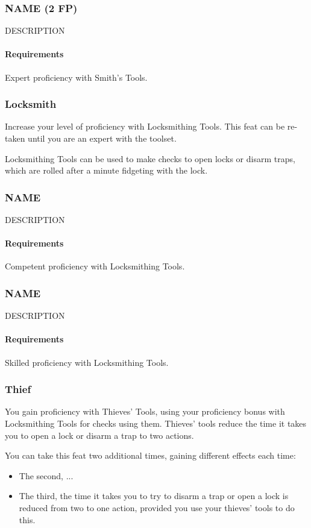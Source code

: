 \subsubsection{NAME (2 FP)} \label{feat::name}
    DESCRIPTION
    \paragraph{Requirements} Expert proficiency with Smith's Tools.
\subsubsection{Locksmith} \label{feat::locksmith}
    Increase your level of proficiency with Locksmithing Tools.
    This feat can be re-taken until you are an expert with the toolset.

    Locksmithing Tools can be used to make checks to open locks or disarm traps, which are rolled after a minute fidgeting with the lock.
\subsubsection{NAME} \label{feat::name}
    DESCRIPTION
    \paragraph{Requirements} Competent proficiency with Locksmithing Tools.
\subsubsection{NAME} \label{feat::name}
    DESCRIPTION
    \paragraph{Requirements} Skilled proficiency with Locksmithing Tools.
\subsubsection{Thief} \label{feat::thief}
    You gain proficiency with Thieves' Tools, using your proficiency bonus with Locksmithing Tools for checks using them.
    Thieves' tools reduce the time it takes you to open a lock or disarm a trap to two actions.

    You can take this feat two additional times, gaining different effects each time:
    \begin{itemize}
        \item The second, ...
        \item The third, the time it takes you to try to disarm a trap or open a lock is reduced from two to one action, provided you use your thieves' tools to do this.
    \end{itemize}
